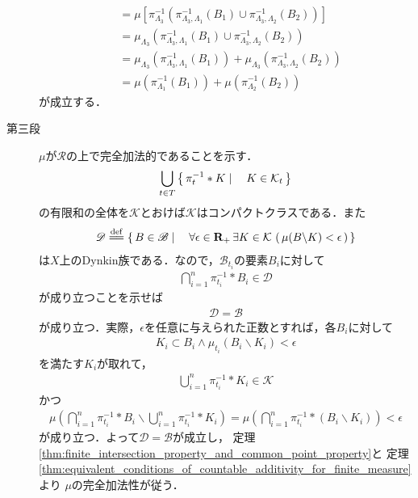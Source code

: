 \begin{prf}
\begin{description}
\begin{align}
					&= \mu\left[ \pi_{\Lambda_3}^{-1}\left( \pi_{\Lambda_3,\Lambda_1}^{-1}(B_1) \cup \pi_{\Lambda_3,\Lambda_2}^{-1}(B_2) \right) \right] \\
					&= \mu_{\Lambda_3} \left( \pi_{\Lambda_3,\Lambda_1}^{-1}(B_1) \cup \pi_{\Lambda_3,\Lambda_2}^{-1}(B_2) \right) \\
					&= \mu_{\Lambda_3} \left( \pi_{\Lambda_3,\Lambda_1}^{-1}(B_1) \right)
						+ \mu_{\Lambda_3} \left( \pi_{\Lambda_3,\Lambda_2}^{-1}(B_2) \right) \\
					&= \mu\left( \pi_{\Lambda_1}^{-1}(B_1) \right)
						+ \mu\left( \pi_{\Lambda_2}^{-1}(B_2) \right)
				\end{align}
				が成立する．
			
			\item[第三段]
				$\mu$が$\mathscr{R}$の上で完全加法的であることを示す．
				\begin{align}
					\bigcup_{t \in T} \left\{\, \pi_t^{-1} \ast K \mid \quad K \in \mathcal{K}_t\, \right\}
				\end{align}
				の有限和の全体を$\mathcal{K}$とおけば$\mathcal{K}$はコンパクトクラスである．また
				\begin{align}
					\mathscr{D} \defeq 
					\Set{B \in \mathscr{B}}{\forall \epsilon \in \R_+\, \exists K \in \mathcal{K}\, 
					\left(\, \mu(B \backslash K) < \epsilon\, \right)}
				\end{align}
				は$X$上のDynkin族である．なので，$\mathscr{B}_{t_i}$の要素$B_i$に対して
				\begin{align}
					\bigcap_{i=1}^n \pi_{t_i}^{-1} \ast B_i \in \mathscr{D}
				\end{align}
				が成り立つことを示せば
				\begin{align}
					\mathscr{D} = \mathscr{B}
				\end{align}
				が成り立つ．実際，$\epsilon$を任意に与えられた正数とすれば，各$B_i$に対して
				\begin{align}
					K_i \subset B_i \wedge \mu_{t_i}(B_i \backslash K_i) < \epsilon
				\end{align}
				を満たす$K_i$が取れて，
				\begin{align}
					\bigcup_{i=1}^n \pi_{t_i}^{-1} \ast K_i \in \mathcal{K}
				\end{align}
				かつ
				\begin{align}
					\mu\left( \bigcap_{i=1}^n \pi_{t_i}^{-1} \ast B_i \backslash 
					\bigcup_{i=1}^n \pi_{t_i}^{-1} \ast K_i \right)
					= \mu\left( \bigcap_{i=1}^n \pi_{t_i}^{-1} \ast (B_i \backslash K_i) \right)
					< \epsilon
				\end{align}
				が成り立つ．よって$\mathscr{D} = \mathscr{B}$が成立し，
				定理\ref{thm:finite_intersection_property_and_common_point_property}と
				定理\ref{thm:equivalent_conditions_of_countable_additivity_for_finite_measure}より
				$\mu$の完全加法性が従う．
				\QED
		\end{description}
	\end{prf}